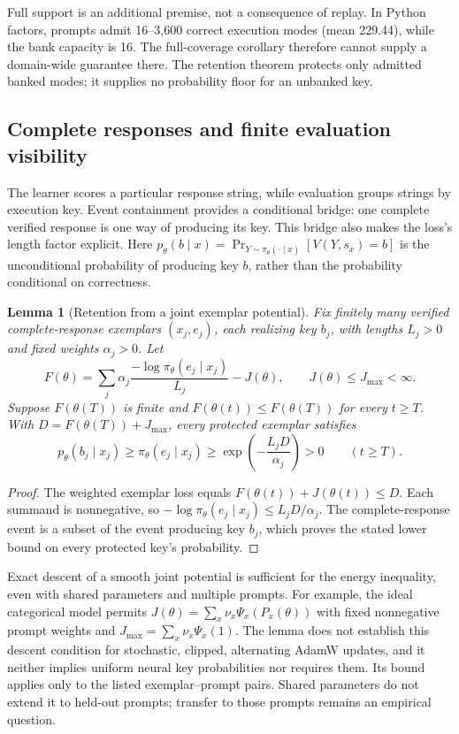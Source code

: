 \documentclass{article}
\newcommand{\1}{\mathbf 1}
\newtheorem{lemma}{Lemma}[section]
\theoremstyle{remark}
\theoremstyle{definition}
\theoremstyle{plain}
\begin{document}
Full support is an additional premise, not a consequence of replay. In
Python factors, prompts admit 16--3,600 correct execution modes (mean 229.44),
while the bank capacity is 16. The full-coverage corollary therefore cannot
supply a domain-wide guarantee there. The retention theorem protects only
admitted banked modes; it supplies no probability floor for an unbanked key.

\subsection{Complete responses and finite evaluation visibility}
\label{app:theory-exemplar-bridge}

The learner scores a particular response string, while evaluation groups
strings by execution key. Event containment provides a conditional bridge:
one complete verified response is one way of producing its key. This bridge
also makes the loss's length factor explicit. Here
$p_\theta(b\mid x)=\Pr_{Y\sim\pi_\theta(\cdot\mid x)}[V(Y,s_x)=b]$
is the unconditional probability of producing key $b$, rather than the
probability conditional on correctness.

\begin{lemma}[Retention from a joint exemplar potential]
\label{lem:shared-exemplar-retention}
Fix finitely many verified complete-response exemplars $(x_j,e_j)$, each
realizing key $b_j$, with lengths $L_j>0$ and fixed weights $\alpha_j>0$.
Let
\[
 F(\theta)=\sum_j\alpha_j
 \frac{-\log\pi_\theta(e_j\mid x_j)}{L_j}-J(\theta),
 \qquad J(\theta)\le J_{\max}<\infty.
\]
Suppose $F(\theta(T))$ is finite and
$F(\theta(t))\le F(\theta(T))$ for every $t\ge T$. With
$D=F(\theta(T))+J_{\max}$, every protected exemplar satisfies
\[
 p_\theta(b_j\mid x_j)\ge\pi_\theta(e_j\mid x_j)
 \ge\exp\!\left(-\frac{L_jD}{\alpha_j}\right)>0
 \qquad(t\ge T).
\]
\end{lemma}
\begin{proof}
The weighted exemplar loss equals $F(\theta(t))+J(\theta(t))\le D$.
Each summand is nonnegative, so
$-\log\pi_\theta(e_j\mid x_j)\le L_jD/\alpha_j$.
The complete-response event is a subset of the event producing key $b_j$,
which proves the stated lower bound on every protected key's probability.
\end{proof}

Exact descent of a smooth joint potential is sufficient for the energy
inequality, even with shared parameters and multiple prompts. For example,
the ideal categorical model permits
$J(\theta)=\sum_x\nu_x\Psi_x(P_x(\theta))$ with fixed nonnegative prompt
weights and $J_{\max}=\sum_x\nu_x\Psi_x(1)$. The lemma does not establish
this descent condition for stochastic, clipped, alternating AdamW updates,
and it neither implies uniform neural key probabilities nor requires them.
Its bound applies only to the listed exemplar--prompt pairs. Shared
parameters do not extend it to held-out prompts; transfer to those prompts
remains an empirical question.
\end{document}
